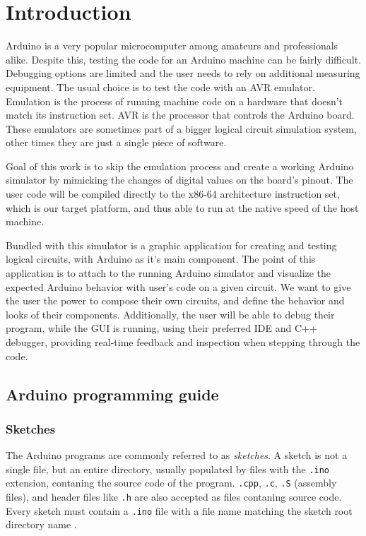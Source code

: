 \chapter*{Introduction}

Arduino is a very popular microcomputer among amateurs and professionals alike. Despite this, testing the code for an Arduino machine can be fairly difficult. Debugging options are limited and the user needs to rely on additional measuring equipment. The usual choice is to test the code with an AVR emulator. Emulation is the process of running machine code on a hardware that doesn't match its instruction set. AVR is the processor that controls the Arduino board. These emulators are sometimes part of a bigger logical circuit simulation system, other times they are just a single piece of software.

Goal of this work is to skip the emulation process and create a working Arduino simulator by mimicking the changes of digital values on the board's pinout. The user code will be compiled directly to the x86-64 architecture instruction set, which is our target platform, and thus able to run at the native speed of the host machine.

Bundled with this simulator is a graphic application for creating and testing logical circuits, with Arduino as it's main component. The point of this application is to attach to the running Arduino simulator and visualize the expected Arduino behavior with user's code on a given circuit. We want to give the user the power to compose their own circuits, and define the behavior and looks of their components. Additionally, the user will be able to debug their program, while the GUI is running, using their preferred IDE and C++ debugger, providing real-time feedback and inspection when stepping through the code.

\section{Arduino programming guide}

\subsection{Sketches}

The Arduino programs are commonly referred to as \textit{sketches}. A sketch is not a single file, but an entire directory, usually populated by files with the \texttt{.ino} extension, contaning the source code of the program. \texttt{.cpp}, \texttt{.c}, \texttt{.S} (assembly files), and header files like \texttt{.h} are also accepted as files contaning source code. Every sketch must contain a \texttt{.ino} file with a file name matching the sketch root directory name \cite{arduino_sketch_specs}.

